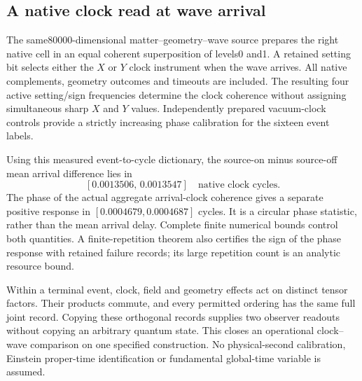 \subsection{A native clock read at wave arrival}

The same80000-dimensional matter--geometry--wave source prepares the right
native cell in an equal coherent superposition of levels0 and1.
A retained setting bit selects either the $X$ or $Y$ clock instrument when
the wave arrives. All native complements, geometry outcomes and timeouts
are included. The resulting four active setting/sign frequencies determine
the clock coherence without assigning simultaneous sharp $X$ and $Y$ values.
Independently prepared vacuum-clock controls provide a strictly increasing
phase calibration for the sixteen event labels.

Using this measured event-to-cycle dictionary, the source-on minus
source-off mean arrival difference lies in
\[
 [0.0013506,\,0.0013547]\quad\text{native clock cycles}.
\]
The phase of the actual aggregate arrival-clock coherence gives a separate
positive response in
$[0.0004679,0.0004687]$ cycles. It is a circular phase statistic, rather than
the mean arrival delay. Complete finite numerical bounds control both
quantities. A finite-repetition theorem also certifies the sign of the
phase response with retained failure records; its large repetition count
is an analytic resource bound.

Within a terminal event, clock, field and geometry effects act on distinct
tensor factors. Their products commute, and every permitted ordering has
the same full joint record. Copying these orthogonal records supplies two
observer readouts without copying an arbitrary quantum state. This closes
an operational clock--wave comparison on one specified construction.
No physical-second calibration, Einstein proper-time identification or
fundamental global-time variable is assumed.
